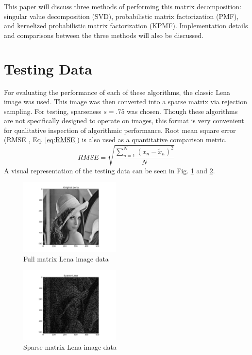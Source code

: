 \documentclass[journal]{IEEEtran}
\begin{document}
This paper will discuss three methods of performing this matrix decomposition: singular value decomposition (SVD), 
probabilistic matrix factorization (PMF), and kernelized probabilistic matrix factorization (KPMF). Implementation details and comparisons between
the three methods will also be discussed.

\section{Testing Data}
For evaluating the performance of each of these algorithms, the classic Lena image was used. This image was then converted into a sparse matrix via 
rejection sampling. For testing, sparseness \begin{math}s = .75\end{math} was chosen. Though these algorithms are not specifically designed to operate on 
images, this format is very convenient for qualitative inspection of algorithmic performance. Root mean square error (RMSE \cite{RMSE},
Eq. \ref{eq:RMSE}) is also used as a quantitative comparison metric.
\begin{equation}
    RMSE=\sqrt{\frac{\sum\limits^N_{n=1}(x_n-\tilde{x}_{n})^2}{N}}
\label{eq:RMSE}
\end{equation}
A visual representation of the testing data can be seen in Fig. \ref{fig:lena} and \ref{fig:sparselena}.
\begin{figure}[h!]
\centering
    \includegraphics[width=0.45\textwidth]{lena.png}
    \caption{Full matrix Lena image data}
    \label{fig:lena}
\end{figure}
\begin{figure}[h!]
\centering
    \includegraphics[width=0.45\textwidth]{sparselena.png}
    \caption{Sparse matrix Lena image data}
    \label{fig:sparselena}
\end{figure}
\end{document}
